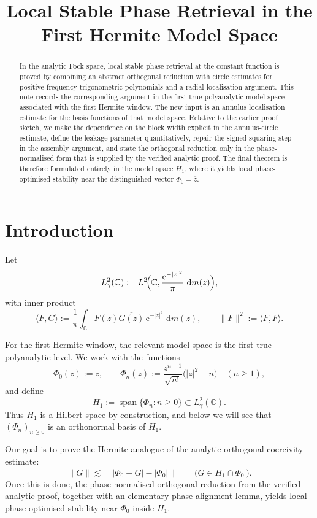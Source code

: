 \documentclass[11pt]{amsart}
\title{Local Stable Phase Retrieval in the First Hermite Model Space}
\theoremstyle{remark}
\newcommand{\C}{\mathbb{C}}
\newcommand{\abs}[1]{\lvert #1 \rvert}
\newcommand{\norm}[1]{\lVert #1 \rVert}
\newcommand{\ip}[2]{\langle #1,#2\rangle}
\newcommand{\dd}{\,\mathrm{d}}
\newcommand{\ee}{\mathrm{e}}
\begin{document}
\begin{abstract}
In the analytic Fock space, local stable phase retrieval at the constant
function is proved by combining an abstract orthogonal reduction with circle
estimates for positive-frequency trigonometric polynomials and a radial
localisation argument. This note records the corresponding argument in the
first true polyanalytic model space associated with the first Hermite window.
The new input is an annulus localisation estimate for the basis functions of
that model space. Relative to the earlier proof sketch, we make the dependence
on the block width explicit in the annulus-circle estimate, define the leakage
parameter quantitatively, repair the signed squaring step in the assembly
argument, and state the orthogonal reduction only in the phase-normalised form
that is supplied by the verified analytic proof. The final theorem is therefore
formulated entirely in the model space $H_1$, where it yields local
phase-optimised stability near the distinguished vector $\Phi_0=\overline z$.
\end{abstract}

\maketitle

\section{Introduction}

Let
\[
L^2_\gamma(\C)
:=
L^2\!\Bigl(\C,\frac{\ee^{-\abs{z}^2}}{\pi}\,\dd m(z)\Bigr),
\]
with inner product
\[
\ip{F}{G}
:=
\frac1\pi \int_\C F(z)\overline{G(z)}\,\ee^{-\abs{z}^2}\,\dd m(z),
\qquad
\norm{F}^2 := \ip{F}{F}.
\]

For the first Hermite window, the relevant model space is the first true
polyanalytic level. We work with the functions
\[
\Phi_0(z) := \overline z,
\qquad
\Phi_n(z) := \frac{z^{n-1}}{\sqrt{n!}}\bigl(\abs{z}^2 - n\bigr)
\quad (n \ge 1),
\]
and define
\[
H_1 := \overline{\operatorname{span}}\{\Phi_n : n \ge 0\} \subset L^2_\gamma(\C).
\]
Thus $H_1$ is a Hilbert space by construction, and below we will see that
$(\Phi_n)_{n\ge0}$ is an orthonormal basis of $H_1$.

Our goal is to prove the Hermite analogue of the analytic orthogonal coercivity
estimate:
\[
\norm{G}
\lesssim
\norm{\abs{\Phi_0 + G} - \abs{\Phi_0}}
\qquad
\bigl(G \in H_1 \cap \Phi_0^\perp\bigr).
\]
Once this is done, the phase-normalised orthogonal reduction from the verified
analytic proof, together with an elementary phase-alignment lemma, yields local
phase-optimised stability near $\Phi_0$ inside $H_1$.
\end{document}

